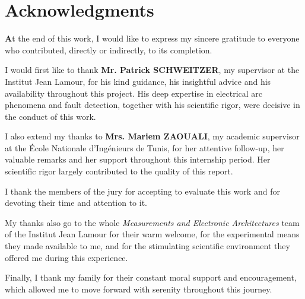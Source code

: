\section*{Acknowledgments}

\vspace{0.8cm}

\noindent\textbf{A}t the end of this work, I would like to express my sincere gratitude to everyone who contributed, directly or indirectly, to its completion.

\medskip

I would first like to thank \textbf{Mr. Patrick SCHWEITZER}, my supervisor at the Institut Jean Lamour, for his kind guidance, his insightful advice and his availability throughout this project. His deep expertise in electrical arc phenomena and fault detection, together with his scientific rigor, were decisive in the conduct of this work.

\medskip

I also extend my thanks to \textbf{Mrs. Mariem ZAOUALI}, my academic supervisor at the École Nationale d'Ingénieurs de Tunis, for her attentive follow-up, her valuable remarks and her support throughout this internship period. Her scientific rigor largely contributed to the quality of this report.

\medskip

I thank the members of the jury for accepting to evaluate this work and for devoting their time and attention to it.

\medskip

My thanks also go to the whole \emph{Measurements and Electronic Architectures} team of the Institut Jean Lamour for their warm welcome, for the experimental means they made available to me, and for the stimulating scientific environment they offered me during this experience.

\medskip

Finally, I thank my family for their constant moral support and encouragement, which allowed me to move forward with serenity throughout this journey.
